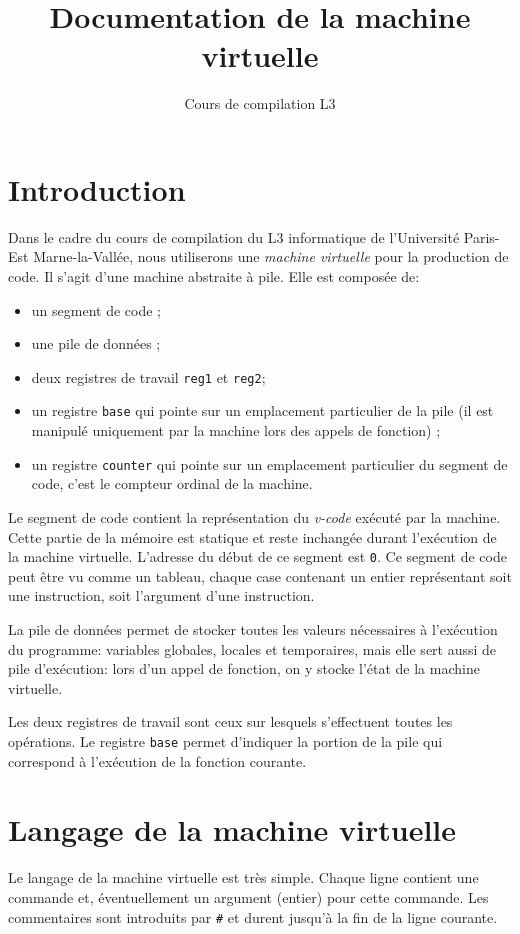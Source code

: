 \documentclass[12pt,a4]{article}
\title{\textbf{Documentation de la machine virtuelle}}
\author{Cours de compilation L3}
\begin{document}
\maketitle
\tableofcontents

\bigskip
\section{Introduction}

Dans le cadre du cours de compilation du L3 informatique de
l'Université Paris-Est Marne-la-Vallée, nous utiliserons une {\em
  machine virtuelle} pour la production de code. Il s'agit d'une
machine abstraite à pile. Elle est composée de:
\begin{itemize}
\item un segment de code ;
\item une pile de données ;
\item deux registres de travail {\tt reg1} et {\tt reg2};
\item un registre {\tt base} qui pointe sur un emplacement
  particulier de la pile (il est manipulé uniquement par la machine
  lors des appels de fonction) ;
\item un registre {\tt counter} qui pointe sur un emplacement
  particulier du segment de code, c'est le compteur ordinal de la
  machine.
\end{itemize}

Le segment de code contient la représentation du {\it v-code} exécuté
par la machine. Cette partie de la mémoire est statique et reste
inchangée durant l'exécution de la machine virtuelle. L'adresse du
début de ce segment est {\tt 0}. Ce segment de code peut être vu comme
un tableau, chaque case contenant un entier représentant soit une
instruction, soit l'argument d'une instruction.

La pile de données permet de stocker toutes les valeurs nécessaires à
l'exécution du programme: variables globales, locales et temporaires,
mais elle sert aussi de pile d'exécution: lors d'un appel de fonction,
on y stocke l'état de la machine virtuelle.

Les deux registres de travail sont ceux sur lesquels s'effectuent
toutes les opérations. Le registre {\tt base} permet d'indiquer la
portion de la pile qui correspond à l'exécution de la fonction
courante.

\section{Langage de la machine virtuelle}
Le langage de la machine virtuelle est très simple. Chaque ligne
contient une commande et, éventuellement un
argument (entier) pour cette commande.
Les commentaires sont introduits par {\tt \#} et durent jusqu'à la fin
de la ligne courante.
\end{document}
